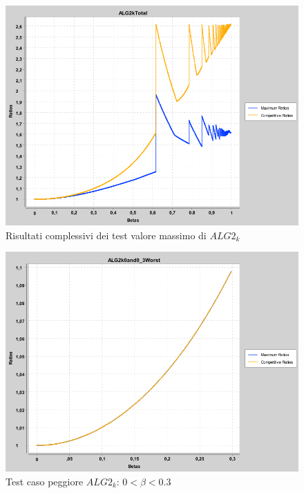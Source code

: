 \documentclass[12pt]{article}
\begin{document}
\begin{figure}[H]
\caption{Risultati complessivi dei test valore massimo di $ALG2_{k}$}
\centering
\includegraphics[scale=0.4]{max/ALG2kTotal.png}
\end{figure}
\begin{figure}[H]
\caption{Test caso peggiore $ALG2_{k}$: $0 < \beta < 0.3$}
\centering
\includegraphics[scale=0.4]{max/ALG2k0and0_3Worst.png}
\end{figure}
\end{document}
